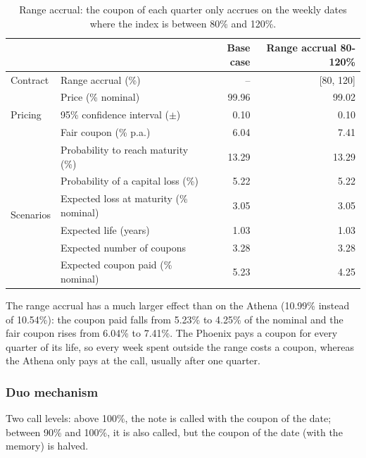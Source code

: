 \documentclass[11pt,a4paper]{article}
\begin{document}
\begin{table}[htbp]
  \centering
  \small
  \begin{tabular}{llrr}
    \toprule
     & & \textbf{Base case} & \textbf{Range accrual 80-120\%} \\
    \midrule
    \multirow{1}{*}{Contract}
      & Range accrual (\%) & -- & [80, 120] \\
    \midrule
    \multirow{3}{*}{Pricing}
      & Price (\% nominal) & 99.96 & 99.02 \\
      & 95\% confidence interval ($\pm$) & 0.10 & 0.10 \\
      & Fair coupon (\% p.a.) & 6.04 & 7.41 \\
    \midrule
    \multirow{6}{*}{Scenarios}
      & Probability to reach maturity (\%) & 13.29 & 13.29 \\
      & Probability of a capital loss (\%) & 5.22 & 5.22 \\
      & Expected loss at maturity (\% nominal) & 3.05 & 3.05 \\
      & Expected life (years) & 1.03 & 1.03 \\
      & Expected number of coupons & 3.28 & 3.28 \\
      & Expected coupon paid (\% nominal) & 5.23 & 4.25 \\
    \bottomrule
  \end{tabular}
  \caption{Range accrual: the coupon of each quarter only accrues on the weekly dates where the index is between 80\% and 120\%.}
  \label{tab:phoenix-range}
\end{table}

The range accrual has a much larger effect than on the Athena (10.99\% instead of 10.54\%): the coupon paid falls
from 5.23\% to 4.25\% of the nominal and the fair coupon rises from 6.04\% to 7.41\%. The Phoenix pays a coupon for
every quarter of its life, so every week spent outside the range costs a coupon, whereas the Athena only pays at the
call, usually after one quarter.

\clearpage
\subsubsection{Duo mechanism}

Two call levels: above 100\%, the note is called with the coupon of the date; between 90\% and 100\%, it is also
called, but the coupon of the date (with the memory) is halved.
\end{document}
